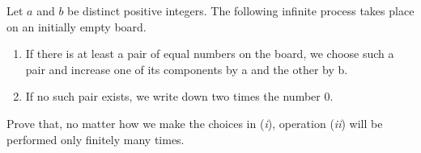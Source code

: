 Let $a$ and $b$ be distinct positive integers. The following infinite process takes place on an initially empty board.

\begin{enumerate}
	\item If there is at least a pair of equal numbers on the board, we choose such a pair and increase one of its components by a and the other by b.

	\item If no such pair exists, we write down two times the number 0. 
\end{enumerate}

Prove that, no matter how we make the choices in (\textit{i}), operation (\textit{ii}) will be performed only finitely many times.